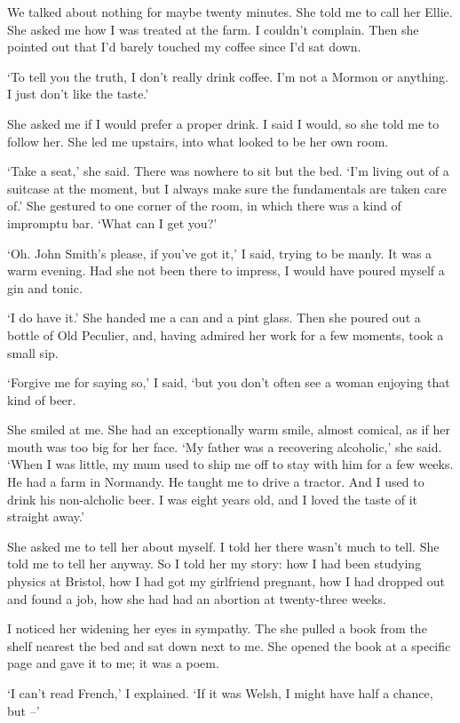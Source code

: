 We talked about nothing for maybe twenty minutes. She told me to call her Ellie. She asked me how I was treated at the farm. I couldn't complain. Then she pointed out that I'd barely touched my coffee since I'd sat down.

`To tell you the truth, I don't really drink coffee. I'm not a Mormon or anything. I just don't like the taste.'

She asked me if I would prefer a proper drink. I said I would, so she told me to follow her. She led me upstairs, into what looked to be her own room.

`Take a seat,' she said. There was nowhere to sit but the bed. `I'm living out of a suitcase at the moment, but I always make sure the fundamentals are taken care of.' She gestured to one corner of the room, in which there was a kind of impromptu bar. `What can I get you?'

`Oh. John Smith's please, if you've got it,' I said, trying to be manly. It was a warm evening. Had she not been there to impress, I would have poured myself a gin and tonic.

`I do have it.' She handed me a can and a pint glass. Then she poured out a bottle of Old Peculier, and, having admired her work for a few moments, took a small sip.

`Forgive me for saying so,' I said, `but you don't often see a woman enjoying that kind of beer.

She smiled at me. She had an exceptionally warm smile, almost comical, as if her mouth was too big for her face. `My father was a recovering alcoholic,' she said. `When I was little, my mum used to ship me off to stay with him for a few weeks. He had a farm in Normandy. He taught me to drive a tractor. And I used to drink his non-alcholic beer. I was eight years old, and I loved the taste of it straight away.'

She asked me to tell her about myself. I told her there wasn't much to tell. She told me to tell her anyway. So I told her my story: how I had been studying physics at Bristol, how I had got my girlfriend pregnant, how I had dropped out and found a job, how she had had an abortion at twenty-three weeks.

I noticed her widening her eyes in sympathy. The she pulled a book from the shelf nearest the bed and sat down next to me. She opened the book at a specific page and gave it to me; it was a poem.

`I can't read French,' I explained. `If it was Welsh, I might have half a chance, but --'

